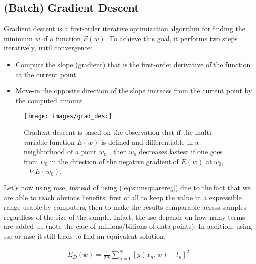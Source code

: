 \subsection{(Batch) Gradient Descent}
\label{subsec:batchgradientdescen}
\noindent Gradient descent is a first-order iterative optimization algorithm for finding the minimum $w$ of a function $E(w)$. To achieve this goal, it performs two steps iteratively, until convergence:

\begin{itemize}
	\item Compute the slope (gradient) that is the first-order derivative of the function at the current point
	\item Move-in the opposite direction of the slope increase from the current point by the computed amount
\end{itemize}

\begin{figure}[H]
	\centering
	\texttt{[image: images/grad\_desc]}
	\caption[Gradient descent.]{Gradient descent is based on the observation that if the multi-variable function $E(w)$ is defined and differentiable in a neighborhood of a point $w_0$ , then $w_0$ decreases fastest if one goes from $w_0$  in the direction of the negative gradient of $E(w)$ at $w_0$, $-\nabla E(w_0)$.}
	\label{fig:grad_desc}
\end{figure}

\noindent Let's now using \gls{mse}, instead of using (\ref{eq:sumsquarereg}) due to the fact that we are able to reach obvious benefits: first of all to keep the value in a expressible range usable by computers, then to make the results comparable across samples regardless of the size of the sample. Infact, the \gls{sse} depends on how many terms are added up (note the case of millions/billions of data points). In addition, using \gls{sse} or \gls{mse} it still leads to find an equivalent solution.

\begin{Equation}[H]
	\centering
	\begin{equation} \label{eq:mser}
		\begin{aligned}
			E_D(w) = \frac{1}{2N} \sum_{n=1}^{N} [y(x_n,w)-t_n]^2
		\end{aligned}
	\end{equation}
	\caption[Mean Squared Error.]{Mean Squared Error. $1/2$ is added, as in \gls{sse}, so the derivative doesn't need a constant out front. We get away with it because the minima of $E_D(w)$ and $E_D(w) / 2$ are achieved at the same value(s) of $w$.}
\end{Equation}

